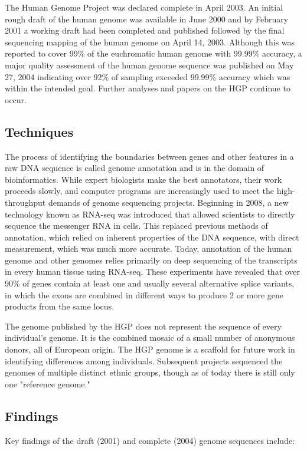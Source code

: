 \documentclass[12pt]{article}
\begin{document}
The Human Genome Project was declared complete in April 2003. An initial rough draft of the human genome was available in June 2000 and by February 2001 a working draft had been completed and published followed by the final sequencing mapping of the human genome on April 14, 2003. Although this was reported to cover 99\% of the euchromatic human genome with 99.99\% accuracy, a major quality assessment of the human genome sequence was published on May 27, 2004 indicating over 92\% of sampling exceeded 99.99\% accuracy which was within the intended goal. Further analyses and papers on the HGP continue to occur.

\subsection{Techniques}

The process of identifying the boundaries between genes and other features in a raw DNA sequence is called genome annotation and is in the domain of bioinformatics. While expert biologists make the best annotators, their work proceeds slowly, and computer programs are increasingly used to meet the high-throughput demands of genome sequencing projects. Beginning in 2008, a new technology known as RNA-seq was introduced that allowed scientists to directly sequence the messenger RNA in cells. This replaced previous methods of annotation, which relied on inherent properties of the DNA sequence, with direct measurement, which was much more accurate. Today, annotation of the human genome and other genomes relies primarily on deep sequencing of the transcripts in every human tissue using RNA-seq. These experiments have revealed that over 90\% of genes contain at least one and usually several alternative splice variants, in which the exons are combined in different ways to produce 2 or more gene products from the same locus.

The genome published by the HGP does not represent the sequence of every individual's genome. It is the combined mosaic of a small number of anonymous donors, all of European origin. The HGP genome is a scaffold for future work in identifying differences among individuals. Subsequent projects sequenced the genomes of multiple distinct ethnic groups, though as of today there is still only one "reference genome."

\subsection{Findings}
Key findings of the draft (2001) and complete (2004) genome sequences include:
\end{document}

